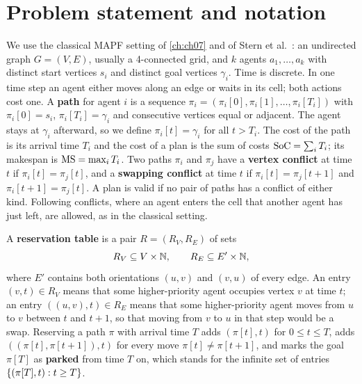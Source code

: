\section{Problem statement and notation}
\label{sec:ch08-problem}

We use the classical MAPF setting of \cref{ch:ch07} and of Stern et
al.~\cite{stern2019mapf}: an undirected graph $G = (V, E)$, usually a 4-connected grid,
and $k$ agents $a_1, \dots, a_k$ with distinct start vertices $s_i$ and distinct goal
vertices $\gamma_i$. Time is discrete. In one time step an agent either moves along an edge
or waits in its cell; both actions cost one. A \textbf{path}
for agent $i$ is a sequence $\pi_i = (\pi_i[0], \pi_i[1], \dots, \pi_i[T_i])$ with
$\pi_i[0] = s_i$, $\pi_i[T_i] = \gamma_i$ and consecutive vertices equal or adjacent. The
agent stays at $\gamma_i$ afterward, so we define $\pi_i[t] = \gamma_i$ for all $t > T_i$. The
cost of the path is its arrival time $T_i$ and the cost of a plan is the sum of costs
$\mathrm{SoC} = \sum_i T_i$; its makespan is $\mathrm{MS} = \max_i T_i$.
Two paths $\pi_i$ and $\pi_j$ have a \textbf{vertex conflict}
at time $t$ if $\pi_i[t] = \pi_j[t]$, and a \textbf{swapping
conflict} at time $t$ if $\pi_i[t] = \pi_j[t+1]$ and
$\pi_i[t+1] = \pi_j[t]$. A plan is valid if no pair of paths has a conflict of either
kind. Following conflicts, where an agent enters the cell that another agent has just
left, are allowed, as in the classical setting.

\begin{definition}
\label{def:ch08-reservation}
A \textbf{reservation table} is a pair
$R = (R_V, R_E)$ of sets
\[
  R_V \subseteq V \times \mathbb{N}, \qquad R_E \subseteq E' \times \mathbb{N},
\]
where $E'$ contains both orientations $(u, v)$ and $(v, u)$ of every edge. An entry
$(v, t) \in R_V$ means that some higher-priority agent occupies vertex $v$ at time $t$;
an entry $((u, v), t) \in R_E$ means that some higher-priority agent moves from $u$ to
$v$ between $t$ and $t+1$, so that moving from $v$ to $u$ in that step would be a swap.
Reserving a path $\pi$ with arrival time $T$ adds $(\pi[t], t)$ for
$0 \le t \le T$, adds $((\pi[t], \pi[t+1]), t)$ for every move $\pi[t] \ne \pi[t+1]$,
and marks the goal $\pi[T]$ as \textbf{parked}
from time $T$ on, which stands for the infinite set of entries $\left\{ (\pi[T], t) : t \ge T \right\}$.
\end{definition}

